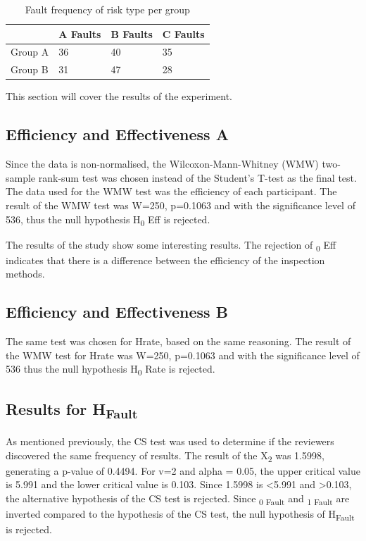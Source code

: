 \documentclass[10pt,twocolumn]{article}
\begin{document}
\begin{table}
	\centering
	\begin{tabular}[Ht]{| l | l | l | l |}
	\hline
	 & A Faults & B Faults & C Faults  \\
	\hline
	Group A & 36 & 40 & 35 \\
	\hline
	Group B & 31 & 47 & 28 \\
	\hline
	\end{tabular}
	\caption{Fault frequency of risk type per group}
\end{table}

This section will cover the results of the experiment.

\subsection{Efficiency and Effectiveness A}
Since the data is non-normalised, the Wilcoxon-Mann-Whitney (WMW) two-sample rank-sum test was chosen instead of the Student's T-test as the final test. The data used for the WMW test was the efficiency of each participant. The result of the WMW test was W=250, p=0.1063 and with the significance level of 536, thus the null hypothesis H\textsubscript{0} Eff is rejected. 

The results of the study show some interesting results. The rejection of \textsubscript{0} Eff indicates that there is a difference between the efficiency of the inspection methods.

\subsection{Efficiency and Effectiveness B}
The same test was chosen for Hrate, based on the same reasoning. The result of the WMW test for Hrate was W=250, p=0.1063 and with the significance level of 536 thus the null hypothesis H\textsubscript{0} Rate is rejected. 


\subsection{Results for H\textsubscript{Fault}}
As mentioned previously, the CS test was used to determine if the reviewers discovered the same frequency of results. The result of the X\textsubscript{2} was 1.5998, generating a p-value of 0.4494. For v=2 and alpha = 0.05, the upper critical value is 5.991 and the lower critical value is 0.103. Since 1.5998 is \textless 5.991 and \textgreater 0.103, the alternative hypothesis of the CS test is rejected. Since \textsubscript{0 Fault} and \textsubscript{1 Fault} are inverted compared to the hypothesis of the CS test, the null hypothesis of H\textsubscript{Fault} is rejected.
\end{document}
